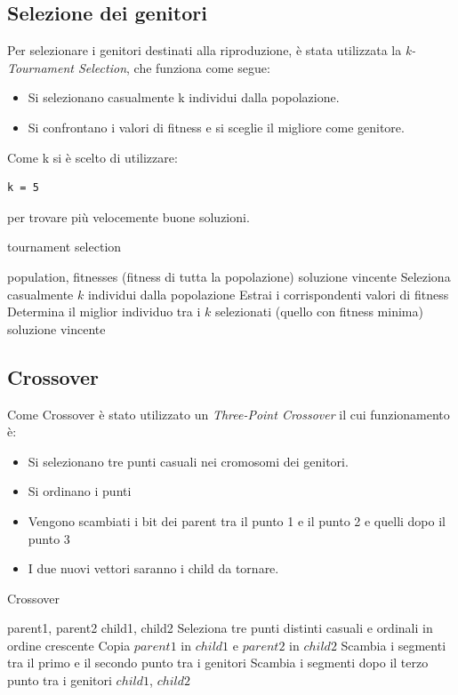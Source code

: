 \documentclass[a4paper,12pt]{article}
\begin{document}
\subsection{Selezione dei genitori}
Per selezionare i genitori destinati alla riproduzione, è stata utilizzata la \textit{k-Tournament Selection}, che funziona come segue:
\begin{itemize}
    \item Si selezionano casualmente k individui dalla popolazione.
    \item Si confrontano i valori di fitness e si sceglie il migliore come genitore.
\end{itemize}
Come k si è scelto di utilizzare:
\begin{verbatim}
k = 5
\end{verbatim}
per trovare più velocemente buone soluzioni.
\begin{algorithm}
\caption{tournament selection}
\begin{algorithmic}[1]
\Require population, fitnesses (fitness di tutta la popolazione)
\Ensure soluzione vincente
\State Seleziona casualmente $k$ individui dalla popolazione
\State Estrai i corrispondenti valori di fitness
\State Determina il miglior individuo tra i $k$ selezionati (quello con fitness minima)
\State \Return soluzione vincente
\end{algorithmic}
\end{algorithm}

\subsection{Crossover}
Come Crossover è stato utilizzato un \textit{Three-Point Crossover} il cui funzionamento è:
\begin{itemize}
    \item Si selezionano tre punti casuali nei cromosomi dei genitori.
    \item Si ordinano i punti
    \item Vengono scambiati i bit dei parent tra il punto 1 e il punto 2 e quelli dopo il punto 3
    \item I due nuovi vettori saranno i child da tornare.
\end{itemize}
\begin{algorithm}
\caption{Crossover}
\begin{algorithmic}[1]
\Require parent1, parent2
\Ensure child1, child2
\State Seleziona tre punti distinti casuali e ordinali in ordine crescente
\State Copia $\mathit{parent1}$ in $\mathit{child1}$ e $\mathit{parent2}$ in $\mathit{child2}$
\State Scambia i segmenti tra il primo e il secondo punto tra i genitori
\State Scambia i segmenti dopo il terzo punto tra i genitori
\State \Return $\mathit{child1}$, $\mathit{child2}$
\end{algorithmic}
\end{algorithm}
\end{document}
